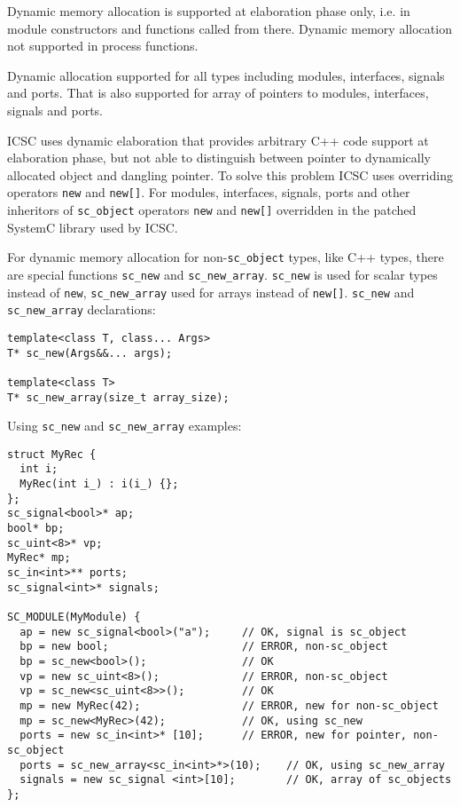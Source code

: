 Dynamic memory allocation is supported at elaboration phase only, i.e. in module constructors and functions called from there. Dynamic memory allocation not supported in process functions.

Dynamic allocation supported for all types including modules, interfaces, signals and ports. That is also supported for array of pointers to modules, interfaces, signals and ports.

ICSC uses dynamic elaboration that provides arbitrary C++ code support at elaboration phase, but not able to distinguish between pointer to dynamically allocated object and dangling pointer. To solve this problem ICSC uses overriding operators {\tt new} and {\tt new[]}. For modules, interfaces, signals, ports and other inheritors of {\tt sc\_object} operators {\tt new} and {\tt new[]} overridden in the patched SystemC library used by ICSC. 

For dynamic memory allocation for non-{\tt sc\_object} types, like C++ types, there are special functions {\tt sc\_new} and {\tt sc\_new\_array}. {\tt sc\_new} is used for scalar types instead of {\tt new}, {\tt sc\_new\_array} used for arrays instead of {\tt new[]}. {\tt sc\_new} and {\tt sc\_new\_array} declarations:
%
\begin{lstlisting}[style=mycpp]
template<class T, class... Args>
T* sc_new(Args&&... args);
 
template<class T>
T* sc_new_array(size_t array_size);
\end{lstlisting}

Using {\tt sc\_new} and {\tt sc\_new\_array} examples:
% 
\begin{lstlisting}[style=mycpp]
struct MyRec {
  int i;
  MyRec(int i_) : i(i_) {};
};
sc_signal<bool>* ap;
bool* bp;
sc_uint<8>* vp;
MyRec* mp;
sc_in<int>** ports;
sc_signal<int>* signals;
   
SC_MODULE(MyModule) {
  ap = new sc_signal<bool>("a");     // OK, signal is sc_object
  bp = new bool;                     // ERROR, non-sc_object
  bp = sc_new<bool>();               // OK
  vp = new sc_uint<8>();             // ERROR, non-sc_object
  vp = sc_new<sc_uint<8>>();         // OK
  mp = new MyRec(42);                // ERROR, new for non-sc_object
  mp = sc_new<MyRec>(42);            // OK, using sc_new
  ports = new sc_in<int>* [10];      // ERROR, new for pointer, non-sc_object 
  ports = sc_new_array<sc_in<int>*>(10);    // OK, using sc_new_array
  signals = new sc_signal <int>[10];        // OK, array of sc_objects 
};
\end{lstlisting}


